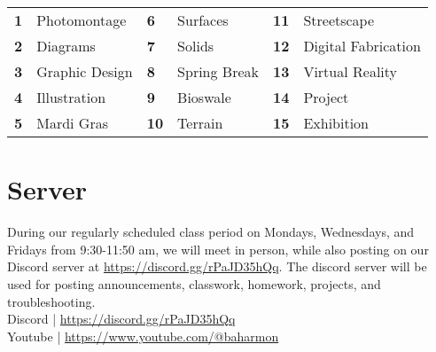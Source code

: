 \documentclass[11pt,article,oneside]{memoir}
\begin{document}
\begin{table}[H]
\begin{tabular}{l l @{\hskip 1.5cm} l l @{\hskip 1.5cm} l l}
\small
\textbf{1} & Photomontage & \textbf{6} & Surfaces & \textbf{11} & Streetscape\\
\textbf{2} & Diagrams & \textbf{7} & Solids & \textbf{12} &  Digital Fabrication\\
\textbf{3} & Graphic Design & \textbf{8} & Spring Break & \textbf{13} & Virtual Reality\\
\textbf{4} & Illustration & \textbf{9} & Bioswale & \textbf{14} & Project\\
\textbf{5} & Mardi Gras & \textbf{10} & Terrain & \textbf{15} & Exhibition \\[0.15cm]
\end{tabular}
\end{table}


\section{Server}

During our regularly scheduled class period
on Mondays, Wednesdays, and Fridays from 9:30-11:50 am,
we will meet in person, while also posting
on our Discord server at \url{https://discord.gg/rPaJD35hQq}.
The discord server will be used for posting
announcements, classwork, homework, projects, and troubleshooting. 
\\

\noindent
Discord | \url{https://discord.gg/rPaJD35hQq}\\
Youtube | \url{https://www.youtube.com/@baharmon}\\

%
\end{document}
